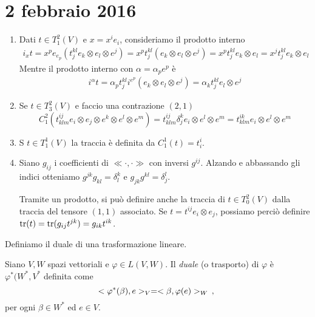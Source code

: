 \chapter{2 febbraio 2016}

\begin{example}
	\begin{enumerate}
		\item Dati $t\in T_1^2(V)$ e $x=x^ie_i$, consideriamo il prodotto interno 
		\begin{align*}
		i_xt = x^pe_{e_p}(t_j^{kl} e_k\otimes e_l\otimes e^j) = x^p t_j^{kl} (e_k\otimes e_l\otimes e^j) = x^pt_j^{kl} e_k\otimes e_l = x^j t_j^{kl} e_k\otimes e_l
		\end{align*}
		Mentre il prodotto interno con $\alpha = \alpha_pe^p$ è
		\begin{align*}
		i^\alpha t = \alpha_p t_j^{kl} i^{e^p}(e_k\otimes e_l\otimes e^j) = \alpha_k t_j^{kl} e_l\otimes e^j
		\end{align*} %
		
		\item Se $t\in T_3^2(V)$ e faccio una contrazione $(2,1)$
		\begin{equation*}
			C_1^2 (t_{klm}^{ij} e_i\otimes e_j\otimes e^k\otimes e^l\otimes e^m ) = t_{klm}^{ij} \delta_j^k e_i\otimes e^l\otimes e^m = t_{klm}^{ik} e_i\otimes e^l\otimes e^m
		\end{equation*}
		
		\item S $t\in T_1^1(V)$ la traccia è definita da $C_1^1(t) = t_i^i$.

		\item Siano $g_{ij}$ i coefficienti di $\ll \cdot, \cdot \gg$ con inversi $g^{ij}$. Alzando e abbassando gli indici otteniamo $g^{jk}g_{kl} = \delta_l^k$ e $g_{jk}g^{kl} = \delta_j^l$.
		
		Tramite un prodotto, si può definire anche la traccia di $t\in T_0^2(V)$ dalla traccia del tensore $(1,1)$ associato. Se $t=t^{ij}e_i\otimes e_j$, possiamo perciò definire $\operatorname{tr} (t) = \operatorname{tr} (g_{ij}t^{jk}) = g_{ik}t^{ik}$.
	\end{enumerate}
\end{example}

Definiamo il duale di una trasformazione lineare.
\begin{definition}
	Siano $V,W$ spazi vettoriali e $\varphi \in L(V,W)$. Il \emph{duale} (o trasporto) di $\varphi$ è $\varphi^*(W^*,V^*$ definita come 
	\begin{equation*} %
		<\varphi^*(\beta), e>_V = < \beta, \varphi(e) >_W \virgola 
	\end{equation*}
	per ogni $\beta \in W^*$ ed $e\in V$.
\end{definition}

